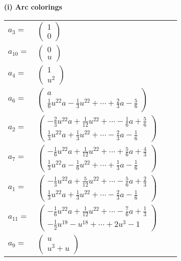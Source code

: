 \documentclass[1p]{elsarticle_modified}
\theoremstyle{definition}
\begin{document}
\flushleft \textbf{(i) Arc colorings}\\
\begin{tabular}{m{7pt} m{180pt} m{7pt} m{180pt} }
\flushright $a_{3}=$&$\begin{pmatrix}1\\0\end{pmatrix}$ \\
\flushright $a_{10}=$&$\begin{pmatrix}0\\u\end{pmatrix}$ \\
\flushright $a_{4}=$&$\begin{pmatrix}1\\u^2\end{pmatrix}$ \\
\flushright $a_{6}=$&$\begin{pmatrix}a\\\frac{1}{6} u^{22} a-\frac{1}{3} u^{22}+\cdots+\frac{2}{3} a-\frac{5}{6}\end{pmatrix}$ \\
\flushright $a_{2}=$&$\begin{pmatrix}-\frac{2}{3} u^{22} a+\frac{1}{12} u^{22}+\cdots-\frac{1}{6} a+\frac{5}{6}\\\frac{1}{3} u^{22} a+\frac{1}{3} u^{22}+\cdots-\frac{2}{3} a-\frac{1}{6}\end{pmatrix}$ \\
\flushright $a_{7}=$&$\begin{pmatrix}-\frac{1}{6} u^{22} a+\frac{1}{12} u^{22}+\cdots+\frac{5}{6} a+\frac{4}{3}\\\frac{1}{3} u^{22} a-\frac{1}{6} u^{22}+\cdots+\frac{1}{3} a-\frac{1}{6}\end{pmatrix}$ \\
\flushright $a_{1}=$&$\begin{pmatrix}-\frac{1}{3} u^{22} a+\frac{5}{12} u^{22}+\cdots-\frac{5}{6} a+\frac{2}{3}\\\frac{1}{3} u^{22} a+\frac{1}{3} u^{22}+\cdots-\frac{2}{3} a-\frac{1}{6}\end{pmatrix}$ \\
\flushright $a_{11}=$&$\begin{pmatrix}-\frac{1}{6} u^{22} a+\frac{1}{12} u^{22}+\cdots-\frac{7}{6} a+\frac{1}{3}\\-\frac{1}{2} u^{19}- u^{18}+\cdots+2 u^3-1\end{pmatrix}$ \\
\flushright $a_{9}=$&$\begin{pmatrix}u\\u^3+u\end{pmatrix}$ \\

\end{tabular}
\end{document}
